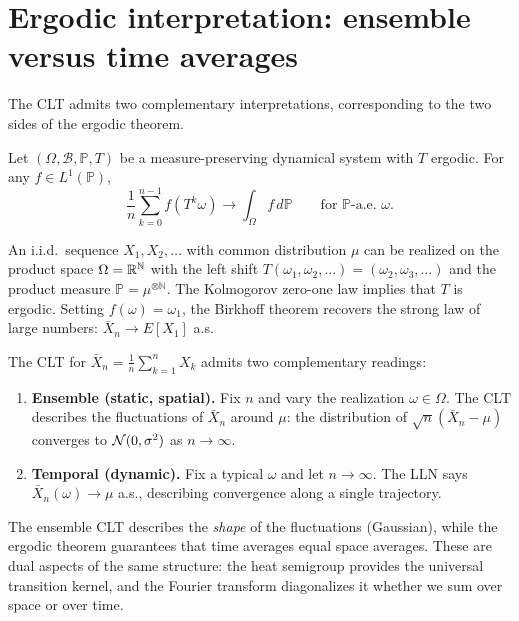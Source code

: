 \section{Ergodic interpretation: ensemble versus time averages}

The CLT admits two complementary interpretations, corresponding to the two sides of the ergodic theorem.

\begin{theorem}\label{thm:birkhoff}
Let $(\Omega, \mathcal{B}, \mathbb{P}, T)$ be a measure-preserving dynamical system with $T$ ergodic. For any $f \in L^1(\mathbb{P})$,
\[
\frac{1}{n}\sum_{k=0}^{n-1} f(T^k \omega) \longrightarrow \int_\Omega f\, d\mathbb{P} \qquad \text{for $\mathbb{P}$-a.e.\ $\omega$}.
\]
\end{theorem}

\begin{remark}\label{rmk:iid-ergodic}
An i.i.d.\ sequence $X_1, X_2, \ldots$ with common distribution $\mu$ can be realized on the product space $\Omega = \mathbb{R}^{\mathbb{N}}$ with the left shift $T(\omega_1, \omega_2, \ldots) = (\omega_2, \omega_3, \ldots)$ and the product measure $\mathbb{P} = \mu^{\otimes \mathbb{N}}$. The Kolmogorov zero-one law implies that $T$ is ergodic. Setting $f(\omega) = \omega_1$, the Birkhoff theorem recovers the strong law of large numbers: $\bar{X}_n \to E[X_1]$ a.s.
\end{remark}

\begin{remark}\label{rmk:two-views}
The CLT for $\bar{X}_n = \frac{1}{n}\sum_{k=1}^n X_k$ admits two complementary readings:
\begin{enumerate}[label=(\alph*)]
\item \textbf{Ensemble (static, spatial).} Fix $n$ and vary the realization $\omega \in \Omega$. The CLT describes the fluctuations of $\bar{X}_n$ around $\mu$: the distribution of $\sqrt{n}(\bar{X}_n - \mu)$ converges to $\mathcal{N}(0, \sigma^2)$ as $n \to \infty$.

\item \textbf{Temporal (dynamic).} Fix a typical $\omega$ and let $n \to \infty$. The LLN says $\bar{X}_n(\omega) \to \mu$ a.s., describing convergence along a single trajectory.
\end{enumerate}
The ensemble CLT describes the \emph{shape} of the fluctuations (Gaussian), while the ergodic theorem guarantees that time averages equal space averages. These are dual aspects of the same structure: the heat semigroup provides the universal transition kernel, and the Fourier transform diagonalizes it whether we sum over space or over time.
\end{remark}

